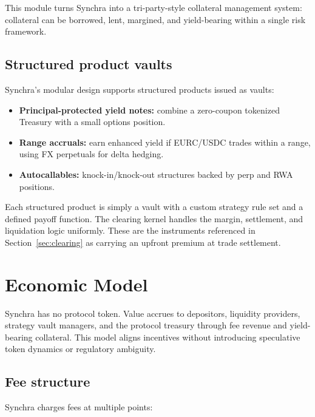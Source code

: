 \documentclass[11pt,a4paper]{article}
\begin{document}
This module turns Synchra into a tri-party-style collateral management system: collateral can be borrowed, lent, margined, and yield-bearing within a single risk framework.

\subsection{Structured product vaults}

Synchra's modular design supports structured products issued as vaults:
\begin{itemize}
  \item \textbf{Principal-protected yield notes:} combine a zero-coupon tokenized Treasury with a small options position.
  \item \textbf{Range accruals:} earn enhanced yield if EURC/USDC trades within a range, using FX perpetuals for delta hedging.
  \item \textbf{Autocallables:} knock-in/knock-out structures backed by perp and RWA positions.
\end{itemize}

Each structured product is simply a vault with a custom strategy rule set and a defined payoff function. The clearing kernel handles the margin, settlement, and liquidation logic uniformly. These are the instruments referenced in Section~\ref{sec:clearing} as carrying an upfront premium at trade settlement.

\section{Economic Model}
\label{sec:economics}

Synchra has no protocol token. Value accrues to depositors, liquidity providers, strategy vault managers, and the protocol treasury through fee revenue and yield-bearing collateral. This model aligns incentives without introducing speculative token dynamics or regulatory ambiguity.

\subsection{Fee structure}

Synchra charges fees at multiple points:
\end{document}
